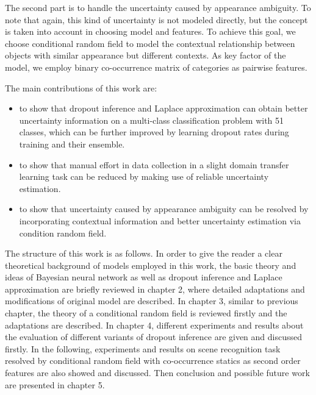 The second part is to handle the uncertainty caused by appearance ambiguity. To note that again, this kind of uncertainty is not modeled directly, but the concept is taken into account in choosing model and features. To achieve this goal, we choose conditional random field to model the contextual relationship between objects with similar appearance but different contexts. As key factor of the model, we employ binary co-occurrence matrix of categories as pairwise features.

The main contributions of this work are:
\begin{itemize}
	\item to show that dropout inference and Laplace approximation can obtain better uncertainty information on a multi-class classification problem with 51 classes, which can be further improved by learning dropout rates during training and their ensemble.
	\item to show that manual effort in data collection in a slight domain transfer learning task can be reduced by making use of reliable uncertainty estimation.
	\item to show that uncertainty caused by appearance ambiguity can be resolved by incorporating contextual information and better uncertainty estimation via condition random field.
\end{itemize}

The structure of this work is as follows. In order to give the reader a clear theoretical background of models employed in this work, the basic theory and ideas of Bayesian neural network as well as dropout inference and Laplace approximation are briefly reviewed in chapter 2, where detailed adaptations and modifications of original model are described. In chapter 3, similar to previous chapter, the theory of a conditional random field is reviewed firstly and the adaptations are described. In chapter 4, different experiments and results about the evaluation of different variants of dropout inference are given and discussed firstly. In the following, experiments and results on scene recognition task resolved by conditional random field with co-occurrence statics as second order features are also showed and discussed. Then conclusion and possible future work are presented in chapter 5.

